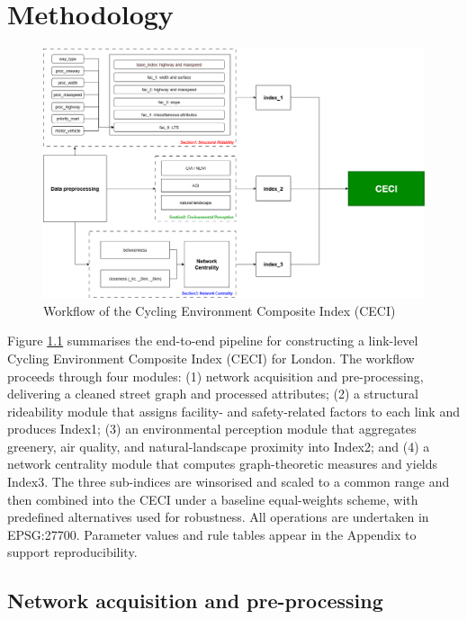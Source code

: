 \documentclass[
  12pt,
  oneside]{book}
\begin{document}
\chapter{Methodology}\label{methodology}

\begin{figure}

{\centering \includegraphics[width=1\linewidth]{general_images/flow} 

}

\caption{Workflow of the Cycling Environment Composite Index (CECI)}\label{fig:flow}
\end{figure}

Figure \ref{fig:flow} summarises the end-to-end pipeline for constructing a link-level Cycling Environment Composite Index (CECI) for London. The workflow proceeds through four modules: (1) network acquisition and pre-processing, delivering a cleaned street graph and processed attributes; (2) a structural rideability module that assigns facility- and safety-related factors to each link and produces Index1; (3) an environmental perception module that aggregates greenery, air quality, and natural-landscape proximity into Index2; and (4) a network centrality module that computes graph-theoretic measures and yields Index3. The three sub-indices are winsorised and scaled to a common range and then combined into the CECI under a baseline equal-weights scheme, with predefined alternatives used for robustness. All operations are undertaken in EPSG:27700. Parameter values and rule tables appear in the Appendix to support reproducibility.

\section{Network acquisition and pre-processing}\label{network-acquisition-and-pre-processing}
\end{document}
